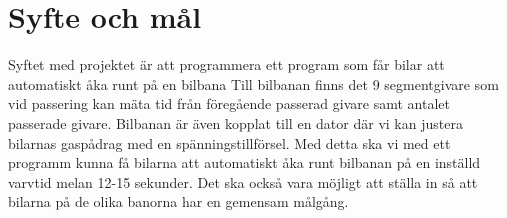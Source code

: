 \section{Syfte och mål}
Syftet med projektet är att programmera ett program som får bilar att automatiskt åka runt på en bilbana
Till bilbanan finns det 9 segmentgivare som vid passering kan mäta tid från föregående passerad givare samt antalet passerade givare.
Bilbanan är även kopplat till en dator där vi kan justera bilarnas gaspådrag med en spänningstillförsel.
Med detta ska vi med ett programm kunna få bilarna att automatiskt åka runt bilbanan på en inställd varvtid melan 12-15 sekunder.
Det ska också vara möjligt att ställa in så att bilarna på de olika banorna har en gemensam målgång.
